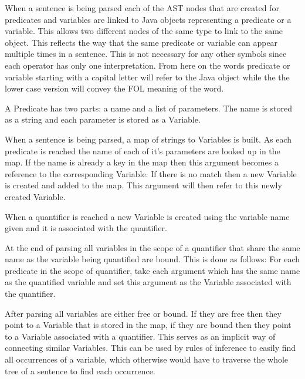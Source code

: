 When a sentence is being parsed each of the AST nodes that are created for predicates and variables are linked to Java objects representing a predicate or a variable.  This allows two different nodes of the same type to link to the same object. This reflects the way that the same predicate or variable can appear multiple times in a sentence. This is not necessary for any other symbols since each operator has only one interpretation. From here on the words predicate or variable starting with a capital letter will refer to the Java object while the the lower case version will convey the FOL meaning of the word.

A Predicate has two parts: a name and a list of parameters. The name is stored as a string and each parameter is stored as a Variable. 

When a sentence is being parsed, a map of strings to Variables is built. As each predicate is reached the name of each of it's parameters are looked up in the map. If the name is already a key in the map then this argument becomes a reference to the corresponding Variable. If there is no match then a new Variable is created and added to the map. This argument will then refer to this newly created Variable.

When a quantifier is reached a new Variable is created using the variable name given and it is associated with the quantifier.

At the end of parsing all variables in the scope of a quantifier that share the same name as the variable being quantified are bound. This is done as follows: For each predicate in the scope of quantifier, take each argument which has the same name as the quantified variable and set this argument as the Variable associated with the quantifier.

After parsing all variables are either free or bound. If they are free then they point to a Variable that is stored in the map, if they are bound then they point to a Variable associated with a quantifier. This serves as an implicit way of connecting similar Variables. This can be used by rules of inference to easily find all occurrences of a variable, which otherwise would have to traverse the whole tree of a sentence to find each occurrence.

